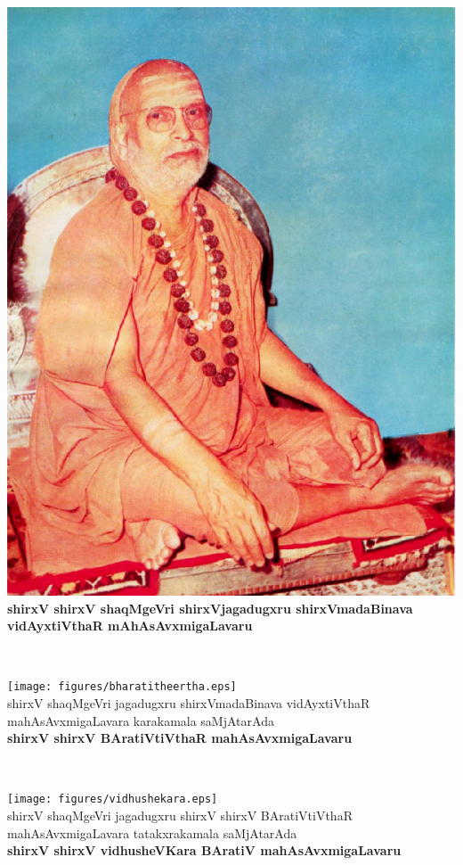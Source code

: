 \begin{center}
\vfill
\thispagestyle{empty}
\includegraphics{figures/abhinava_v_t.eps}\\
{\bf shirxV shirxV shaqMgeVri shirxVjagadugxru shirxVmadaBinava\\ vidAyxtiVthaR mAhAsAvxmigaLavaru}
\vfill
\end{center}
\newpage
~\thispagestyle{empty}
\newpage
\begin{center}
\vfill
\thispagestyle{empty}
\texttt{[image: figures/bharatitheertha.eps]}\\
shirxV shaqMgeVri jagadugxru  shirxVmadaBinava vidAyxtiVthaR\\ mahAsAvxmigaLavara karakamala saMjAtarAda\\ 
{\bf shirxV shirxV BAratiVtiVthaR mahAsAvxmigaLavaru}
\vfill
\end{center}
\newpage
~\thispagestyle{empty}
\newpage
\begin{center}
\vfill
\thispagestyle{empty}
\texttt{[image: figures/vidhushekara.eps]}\\
shirxV shaqMgeVri jagadugxru shirxV shirxV BAratiVtiVthaR\\ mahAsAvxmigaLavara tatakxrakamala saMjAtarAda\\ 
{\bf shirxV shirxV vidhusheVKara BAratiV mahAsAvxmigaLavaru}
\vfill
\end{center}
